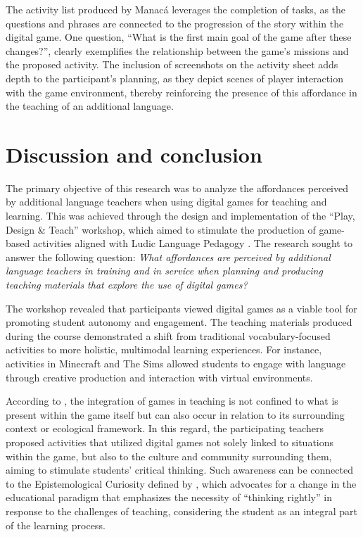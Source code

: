 \documentclass[english]{textolivre}
\begin{document}
The activity list produced by Manacá leverages the completion of tasks, as the questions and phrases are connected to the progression of the story within the digital game. One question, “What is the first main goal of the game after these changes?”, clearly exemplifies the relationship between the game’s missions and the proposed activity. The inclusion of screenshots on the activity sheet adds depth to the participant’s planning, as they depict scenes of player interaction with the game environment, thereby reinforcing the presence of this affordance in the teaching of an additional language.


\section{Discussion and conclusion}\label{sec-formato}
The primary objective of this research was to analyze the affordances perceived by additional language teachers when using digital games for teaching and learning. This was achieved through the design and implementation of the “Play, Design \& Teach” workshop, which aimed to stimulate the production of game-based activities aligned with Ludic Language Pedagogy \cite{york2021playing}. The research sought to answer the following question: \textit{What affordances are perceived by additional language teachers in training and in service when planning and producing teaching materials that explore the use of digital games?}

The workshop revealed that participants viewed digital games as a viable tool for promoting student autonomy and engagement. The teaching materials produced during the course demonstrated a shift from traditional vocabulary-focused activities to more holistic, multimodal learning experiences. For instance, activities in Minecraft and The Sims allowed students to engage with language through creative production and interaction with virtual environments.

According to \textcite{york2021playing}, the integration of games in teaching is not confined to what is present within the game itself but can also occur in relation to its surrounding context or ecological framework. In this regard, the participating teachers proposed activities that utilized digital games not solely linked to situations within the game, but also to the culture and community surrounding them, aiming to stimulate students’ critical thinking. Such awareness can be connected to the Epistemological Curiosity defined by \textcite{freire2011autonomia}, which advocates for a change in the educational paradigm that emphasizes the necessity of “thinking rightly” in response to the challenges of teaching, considering the student as an integral part of the learning process.
\end{document}
